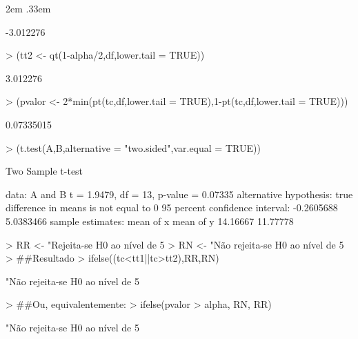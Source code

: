 \documentclass{article}
\newenvironment{ManualExercise}
  {\begin{list}{}{\leftmargin \QuestionIndent
    \partopsep0pt \parsep\parskip \topsep\QuestionBefore
    \itemsep\QuestionBefore \labelwidth2em
    \labelsep.33em
    \usecounter{Question}}}
  {\end{list}}
\begin{document}
\begin{Exercise}
\begin{ManualExercise}
\begin{Schunk}
\begin{Soutput}
[1] -3.012276
\end{Soutput}
\begin{Sinput}
> (tt2 <- qt(1-alpha/2,df,lower.tail = TRUE))
\end{Sinput}
\begin{Soutput}
[1] 3.012276
\end{Soutput}
\begin{Sinput}
> (pvalor <- 2*min(pt(tc,df,lower.tail = TRUE),1-pt(tc,df,lower.tail = TRUE)))
\end{Sinput}
\begin{Soutput}
[1] 0.07335015
\end{Soutput}
\begin{Sinput}
> (t.test(A,B,alternative = "two.sided",var.equal = TRUE))
\end{Sinput}
\begin{Soutput}
	Two Sample t-test

data:  A and B
t = 1.9479, df = 13, p-value = 0.07335
alternative hypothesis: true difference in means is not equal to 0
95 percent confidence interval:
 -0.2605688  5.0383466
sample estimates:
mean of x mean of y 
 14.16667  11.77778 
\end{Soutput}
\begin{Sinput}
> RR <- "Rejeita-se H0 ao nível de 5%
> RN <- "Não rejeita-se H0 ao nível de 5%
> ##Resultado
> ifelse((tc<tt1||tc>tt2),RR,RN)
\end{Sinput}
\begin{Soutput}
[1] "Não rejeita-se H0 ao nível de 5%
\end{Soutput}
\begin{Sinput}
> ##Ou, equivalentemente:
> ifelse(pvalor > alpha, RN, RR)
\end{Sinput}
\begin{Soutput}
[1] "Não rejeita-se H0 ao nível de 5%
\end{Soutput}
\end{Schunk}

\end{ManualExercise}
\end{Exercise}
\end{document}
